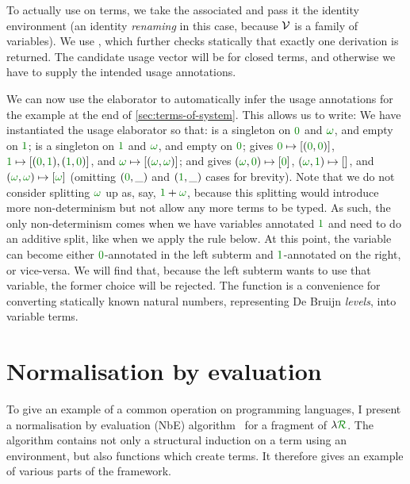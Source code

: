 
To actually use  on terms, we take the associated
 and pass it the identity environment (an identity
\emph{renaming} in this case, because $\mathcal V$ is a family of variables).
We use , which further
checks statically that exactly one derivation is returned.
The candidate usage vector  will be \AgdaFunction{[]} for closed
terms, and otherwise we have to supply the intended usage annotations.

We can now use the elaborator to automatically infer the usage
annotations for the example at the end of \cref{sec:terms-of-system}.
This allows us to write:
We have instantiated the usage elaborator so that:
 is a singleton on $\gr0$ and $\gr\omega$, and
empty on $\gr1$;  is a singleton on $\gr1$ and
$\gr\omega$, and empty on $\gr0$;  gives $\gr0
\mapsto [(\gr0,\gr0)]$, $\gr1 \mapsto [(\gr0,\gr1),(\gr1,\gr0)]$, and
$\gr\omega \mapsto [(\gr\omega,\gr\omega)]$; and 
gives $(\gr\omega, \gr0) \mapsto [\gr0]$, $(\gr\omega, \gr1) \mapsto
[]$, and $(\gr\omega, \gr\omega) \mapsto [\gr\omega]$ (omitting
$(\gr0, \_)$ and $(\gr1, \_)$ cases for brevity). Note that we do not
consider splitting $\gr\omega$ up as, say, $\gr1 + \gr\omega$, because
this splitting would introduce more non-determinism but not allow any
more terms to be typed. As such, the only non-determinism comes when
we have variables annotated $\gr1$ and need to do an additive split,
like when we apply the  rule below. At
this point, the variable can become either $\gr0$-annotated in the
left subterm and $\gr1$-annotated on the right, or vice-versa. We will
find that, because the left subterm wants to use that variable, the
former choice will be rejected. The function  is a
convenience for converting statically known natural numbers,
representing De Bruijn \emph{levels}, into variable terms.


\section{Normalisation by evaluation}\label{sec:nbe}

To give an example of a common operation on programming languages, I present a
normalisation by evaluation (NbE) algorithm~\citep{BS91} for a fragment of
$\name$.
The algorithm contains not only a structural induction on a term using an
environment, but also functions which create terms.
It therefore gives an example of various parts of the framework.

